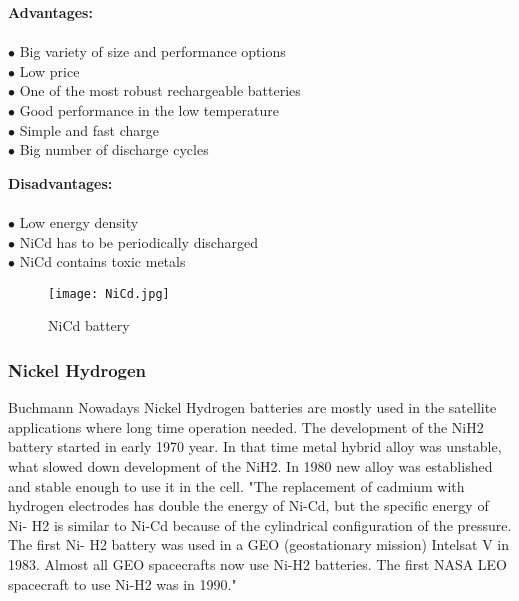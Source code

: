  \newpage

\begin{multicols}{2}

	\textbf{Advantages:} \\ \\
	$\bullet$ Big variety of size and performance options\\
	$\bullet$ Low price\\
	$\bullet$ One of the most robust rechargeable batteries\\
	$\bullet$ Good performance in the low temperature\\
	$\bullet$ Simple and fast charge\\
	$\bullet$ Big number of discharge cycles\\
	
	
	\columnbreak
	
	\textbf{Disadvantages:} \\ \\
	$\bullet$ Low energy density\\
	$\bullet$ NiCd has to be periodically discharged\\
	$\bullet$ NiCd contains toxic metals\\ 

\end{multicols}

\begin{figure}[h]
	\centering
	\texttt{[image: NiCd.jpg]}
	\caption{NiCd battery\cite{9}}
	\label{fig: EPS}
\end{figure}


\subsubsection{Nickel Hydrogen \label{sec:tech}}
Buchmann\cite{7} Nowadays Nickel Hydrogen batteries are mostly used in the satellite applications where long time operation needed. The development of the NiH2 battery started in early 1970 year. In that time metal hybrid alloy was unstable, what slowed down development of the NiH2. In 1980 new alloy was established and stable enough to use it in the cell. 
\cite{10}"The replacement of cadmium with hydrogen electrodes has double the energy of Ni-Cd, but the specific energy of Ni- H2 is similar to Ni-Cd because of the cylindrical configuration of the pressure. The first Ni- H2 battery was used in a GEO (geostationary mission) Intelsat V in 1983.  Almost all GEO spacecrafts now use Ni-H2 batteries. The first NASA LEO spacecraft to use Ni-H2 was in 1990."


